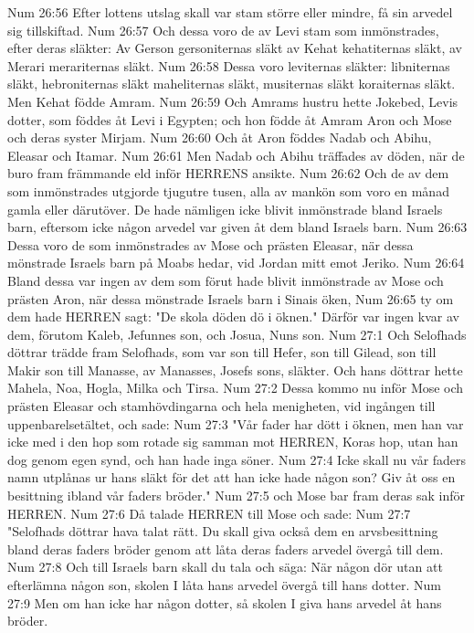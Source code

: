 Num 26:56  Efter lottens utslag skall var stam större eller mindre, få sin arvedel sig tillskiftad.
Num 26:57  Och dessa voro de av Levi stam som inmönstrades, efter deras släkter: Av Gerson gersoniternas släkt av Kehat kehatiternas släkt, av Merari merariternas släkt.
Num 26:58  Dessa voro leviternas släkter: libniternas släkt, hebroniternas släkt maheliternas släkt, musiternas släkt koraiternas släkt. Men Kehat födde Amram.
Num 26:59  Och Amrams hustru hette Jokebed, Levis dotter, som föddes åt Levi i Egypten; och hon födde åt Amram Aron och Mose och deras syster Mirjam.
Num 26:60  Och åt Aron föddes Nadab och Abihu, Eleasar och Itamar.
Num 26:61  Men Nadab och Abihu träffades av döden, när de buro fram främmande eld inför HERRENS ansikte.
Num 26:62  Och de av dem som inmönstrades utgjorde tjugutre tusen, alla av mankön som voro en månad gamla eller därutöver. De hade nämligen icke blivit inmönstrade bland Israels barn, eftersom icke någon arvedel var given åt dem bland Israels barn.
Num 26:63  Dessa voro de som inmönstrades av Mose och prästen Eleasar, när dessa mönstrade Israels barn på Moabs hedar, vid Jordan mitt emot Jeriko.
Num 26:64  Bland dessa var ingen av dem som förut hade blivit inmönstrade av Mose och prästen Aron, när dessa mönstrade Israels barn i Sinais öken,
Num 26:65  ty om dem hade HERREN sagt: "De skola döden dö i öknen." Därför var ingen kvar av dem, förutom Kaleb, Jefunnes son, och Josua, Nuns son.
Num 27:1  Och Selofhads döttrar trädde fram Selofhads, som var son till Hefer, son till Gilead, son till Makir son till Manasse, av Manasses, Josefs sons, släkter. Och hans döttrar hette Mahela, Noa, Hogla, Milka och Tirsa.
Num 27:2  Dessa kommo nu inför Mose och prästen Eleasar och stamhövdingarna och hela menigheten, vid ingången till uppenbarelsetältet, och sade:
Num 27:3  "Vår fader har dött i öknen, men han var icke med i den hop som rotade sig samman mot HERREN, Koras hop, utan han dog genom egen synd, och han hade inga söner.
Num 27:4  Icke skall nu vår faders namn utplånas ur hans släkt för det att han icke hade någon son? Giv åt oss en besittning ibland vår faders bröder."
Num 27:5  och Mose bar fram deras sak inför HERREN.
Num 27:6  Då talade HERREN till Mose och sade:
Num 27:7  "Selofhads döttrar hava talat rätt. Du skall giva också dem en arvsbesittning bland deras faders bröder genom att låta deras faders arvedel övergå till dem.
Num 27:8  Och till Israels barn skall du tala och säga: När någon dör utan att efterlämna någon son, skolen I låta hans arvedel övergå till hans dotter.
Num 27:9  Men om han icke har någon dotter, så skolen I giva hans arvedel åt hans bröder.
